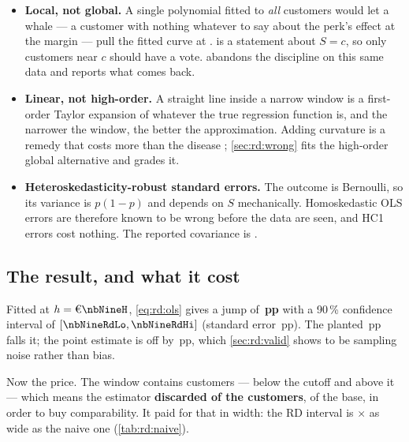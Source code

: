 \begin{itemize}[leftmargin=*, itemsep=.3em]
  \item \textbf{Local, not global.} A single polynomial fitted to \emph{all} \nbNineN{} customers
        would let a  whale --- a customer with nothing whatever to say about the perk's
        effect at the margin --- pull the fitted curve at \eur{\nbNineCutoff}.
         is a statement about $S = c$, so only customers near $c$ should have
        a vote.  abandons the discipline on this same data and reports what comes
        back.
  \item \textbf{Linear, not high-order.} A straight line inside a narrow window is a first-order
        Taylor expansion of whatever the true regression function is, and the narrower the window,
        the better the approximation. Adding curvature is a remedy that costs more than the disease
        \citep{gelman2019}; \cref{sec:rd:wrong} fits the high-order global alternative and grades it.
  \item \textbf{Heteroskedasticity-robust standard errors.} The outcome is Bernoulli, so its
        variance is $p(1-p)$ and depends on $S$ mechanically. Homoskedastic OLS errors are
        therefore known to be wrong before the data are seen, and HC1 errors cost nothing.
        The reported covariance is \nbNineRdCov.
\end{itemize}

\subsection*{The result, and what it cost}

Fitted at $h = \eur{\nbNineH}$, \cref{eq:rd:ols} gives a jump of \textbf{\nbNineRd{}\,pp} with a
90\,\% confidence interval of $[\nbNineRdLo, \nbNineRdHi]$ (standard error \nbNineRdSe{}\,pp). The
planted \nbNineTrueJump{}\,pp falls \nbNineRdVerdict{} it; the point estimate is off by
\nbNineRdErr{}\,pp, which \cref{sec:rd:valid} shows to be sampling noise rather than bias.

Now the price. The window contains \nbNineRdN{} customers --- \nbNineRdNLeft{} below the cutoff and
\nbNineRdNRight{} above it --- which means the estimator \textbf{discarded \nbNineRdDropped{} of the
\nbNineN{} customers}, \pc{\nbNineRdDroppedPct} of the base, in order to buy comparability. It paid
for that in width: the RD interval is \nbNineWidthVsNaive$\times$ as wide as the naive one
(\cref{tab:rd:naive}).

